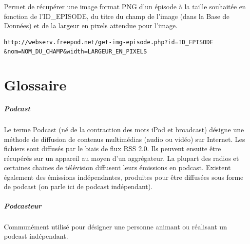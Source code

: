 \documentclass[11pt, french]{report}
\begin{document}
Permet de récupérer une image format PNG d'un épisode à la taille souhaitée en fonction de l'ID\_EPISODE, du titre du champ de l'image (dans la Base de Données) et de la largeur en pixels attendue pour l'image.

\begin{lstlisting}
http://webserv.freepod.net/get-img-episode.php?id=ID_EPISODE
&nom=NOM_DU_CHAMP&width=LARGEUR_EN_PIXELS
\end{lstlisting}

     								
\chapter*{Glossaire}

\paragraph{Podcast}

Le terme Podcast (né de la contraction des mots iPod et broadcast) désigne une méthode de diffusion de contenus multimédias (audio ou vidéo) sur Internet. Les fichiers sont diffusés par le biais de flux RSS 2.0. Ils peuvent ensuite être récupérés sur un appareil au moyen d’un aggrégateur.
La plupart des radios et certaines chaines de télévision diffusent leurs émissions en podcast. Existent également des émissions indépendantes, produites pour être diffusées sous forme de podcast (on parle ici de podcast indépendant).

\paragraph{Podcasteur}

Communément utilisé pour désigner une personne animant ou réalisant un podcast indépendant.




\nocite{*}

\end{document}
